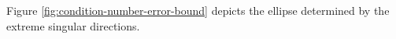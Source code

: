 Figure \ref{fig:condition-number-error-bound} depicts the ellipse determined by the extreme singular directions.

\begin{illustrationfigure}[H]
  \centering
  
  \caption{The unit circle maps to an ellipse with extreme-semiaxis ratio $\kappa_2(A)=\frac{\sigma_{\max}(A)}{\sigma_{\min}(A)}$.}
  \label{fig:condition-number-error-bound}
\end{illustrationfigure}
